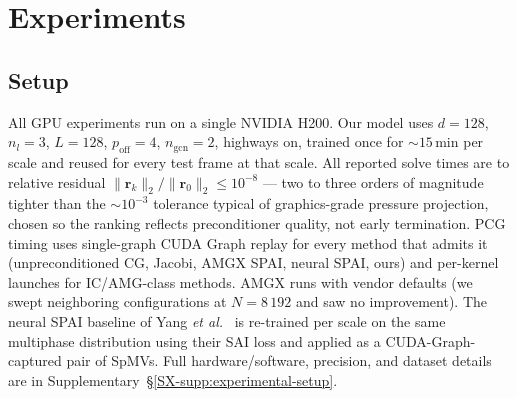 \documentclass[acmtog]{acmart}
\theoremstyle{plain}
\begin{document}
\section{Experiments}
\label{sec:results}

\subsection{Setup}
\label{sec:results:setup}

All GPU experiments run on a single NVIDIA H200. Our model uses $d\!=\!128$,
$n_l\!=\!3$, $L\!=\!128$, $p_{\mathrm{off}}\!=\!4$, $n_{\mathrm{gcn}}\!=\!2$, highways
on, trained once for $\sim\!15$\,min per scale and reused for every test frame at that
scale. All reported solve times are to relative residual
$\|\mathbf{r}_k\|_2/\|\mathbf{r}_0\|_2\!\le\!10^{-8}$ --- two to three orders of
magnitude tighter than the $\sim\!10^{-3}$ tolerance typical of graphics-grade pressure
projection, chosen so the ranking reflects preconditioner quality, not early
termination. PCG timing uses single-graph CUDA Graph replay for every method that
admits it (unpreconditioned CG, Jacobi, AMGX SPAI, neural SPAI, ours) and per-kernel
launches for IC/AMG-class methods. AMGX runs with vendor defaults (we swept neighboring
configurations at $N\!=\!8\,192$ and saw no improvement). The neural SPAI baseline of
Yang \emph{et al.}~\cite{Yang2025sparse} is re-trained per scale on the same multiphase
distribution using their SAI loss and applied as a CUDA-Graph-captured pair of SpMVs.
Full hardware/software, precision, and dataset details are in Supplementary~\S\ref{SX-supp:experimental-setup}.
\end{document}
